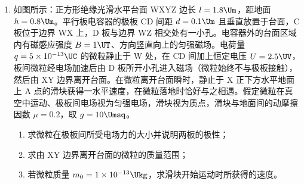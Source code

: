 \documentclass[\gkver]{gaokaozhenti}
\begin{document}
\begin{enumerate}
\item
如图所示：正方形绝缘光滑水平台面 WXYZ 边长 $l=1.8\Um$，距地面 $h=0.8\Um$。平行板电容器的极板 CD 间距 $d=0.1\Um$ 且垂直放置于台面，C 板位于边界 WX 上，D 板与边界 WZ 相交处有一小孔。电容器外的台面区域内有磁感应强度 $B=1\UT$、方向竖直向上的匀强磁场。电荷量 $q=5\times10^{-13}\UC$ 的微粒静止于 W 处，在 CD 间加上恒定电压 $U=2.5\UV$，板间微粒经电场加速后由 D 板所开小孔进入磁场（微粒始终不与极板接触），然后由 XY 边界离开台面。在微粒离开台面瞬时，静止于 X 正下方水平地面上 A 点的滑块获得一水平速度，在微粒落地时恰好与之相遇。假定微粒在真空中运动、极板间电场视为匀强电场，滑块视为质点，滑块与地面间的动摩擦因数 $\mu=0.2$，取 $g=10\Umsq$。
\begin{enumerate}
	\item
	求微粒在极板间所受电场力的大小并说明两板的极性；
	\item
	求由 XY 边界离开台面的微粒的质量范围；
	\item
	若微粒质量 $m_{0}=1\times10^{-13}\Ukg$，求滑块开始运动时所获得的速度。
\end{enumerate}

\end{enumerate}
\end{document}

